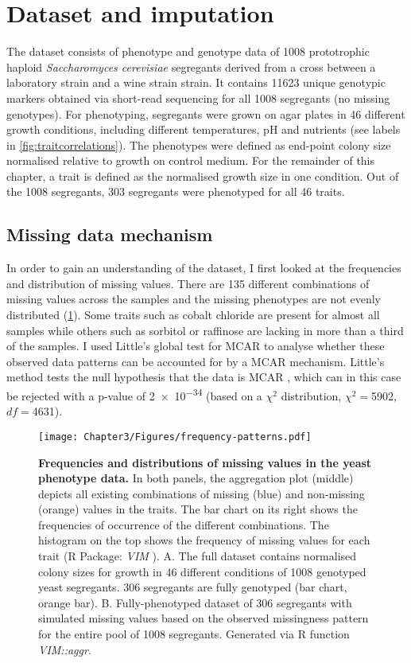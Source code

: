 \section{Dataset and imputation}
The dataset consists of phenotype and genotype data of \num{1008} prototrophic haploid \emph{Saccharomyces cerevisiae} segregants derived from a cross between a laboratory strain and a wine strain strain. It contains \num{11623} unique genotypic markers obtained via short-read sequencing for all \num{1008} segregants (no missing genotypes). For phenotyping, segregants were grown on agar plates in \num{46} different growth conditions, including different temperatures, pH and nutrients (see labels in \cref{fig:traitcorrelations}). The phenotypes were defined as end-point colony size normalised relative to growth on control medium. For the remainder of this chapter, a trait is defined as the normalised growth size in one condition. Out of the \num{1008} segregants, \num{303} segregants were phenotyped for all \num{46} traits.

\subsection{Missing data mechanism} 
In order to gain an understanding of the dataset, I first looked at the frequencies and distribution of missing values. There are \num{135} different combinations of missing values across the samples and the missing phenotypes are not evenly distributed (\cref{fig:missingness}). Some traits such as cobalt chloride are present for almost all samples while others such as sorbitol or raffinose are lacking in more than a third of the samples. I used Little's global test for MCAR to analyse whether these observed data patterns can be accounted for by a MCAR mechanism. Little's method tests the null hypothesis that the data is MCAR \citep{Little1988,Beaujean2015}, which can in this case be rejected with a p-value of \num{2e-34} (based on a \(\chi^2\) distribution, \(\chi^2=\)\num{5902}, \(df=\)\num{4631}). 

\begin{figure}[p]
	\centering
	\texttt{[image: Chapter3/Figures/frequency-patterns.pdf]}
	\caption[\textbf{Frequencies and distributions of missing values in the yeast phenotype data.}]{\textbf{Frequencies and distributions of missing values in the yeast phenotype data. }In both panels, the aggregation plot (middle) depicts all existing combinations of missing (blue) and non-missing (orange) values in the traits. The bar chart on its right shows the frequencies of occurrence of the different combinations. The histogram on the top shows the frequency of missing values for each trait (R Package: \emph{VIM} \citep{Templ2012}). A. The full dataset contains normalised colony sizes for growth in \num{46} different conditions of \num{1008} genotyped yeast segregants. \num{306} segregants are fully genotyped (bar chart, orange bar). B. Fully-phenotyped dataset of \num{306} segregants with simulated missing values based on the observed missingness pattern for the entire pool of \num{1008} segregants.  Generated via R function \textit{VIM::aggr}.}
 	\label{fig:missingness}
\end{figure}

